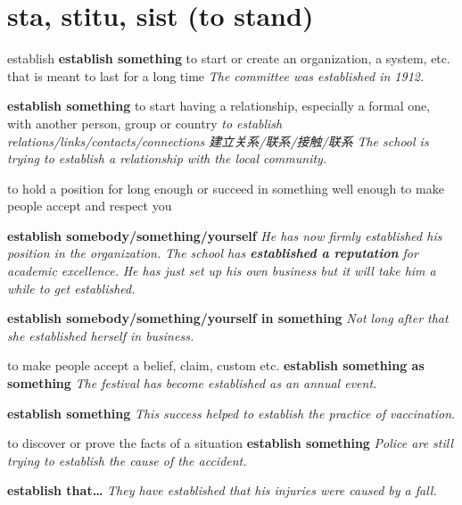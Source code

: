 \section{sta, stitu, sist (to stand)}

\begin{DefWord}{establish}
    \textbf{establish something} to start or create an organization, a system, etc. that is meant to last for a long time
    \textit{The committee was established in 1912.}

    \textbf{establish something} to start having a relationship, especially a formal one, with another person, group or country
    \textit{to establish relations/links/contacts/connections 建立关系/联系/接触/联系}
    \textit{The school is trying to establish a relationship with the local community.}

    to hold a position for long enough or succeed in something well enough to make people accept and respect you

    \textbf{establish somebody/something/yourself} \textit{He has now firmly established his position in the organization.}
    \textit{The school has \textbf{established a reputation} for academic excellence.}
    \textit{He has just set up his own business but it will take him a while to \textit{get established.}}

    \textbf{establish somebody/something/yourself in something} \textit{Not long after that she established herself in business.}

    to make people accept a belief, claim, custom etc.
    \textbf{establish something as something} \textit{The festival has become established as an annual event.}

    \textbf{establish something} \textit{This success helped to establish the practice of vaccination.}

    to discover or prove the facts of a situation
    \textbf{establish something} \textit{Police are still trying to establish the cause of the accident.}

    \textbf{establish that…} \textit{They have established that his injuries were caused by a fall.}
\end{DefWord}

